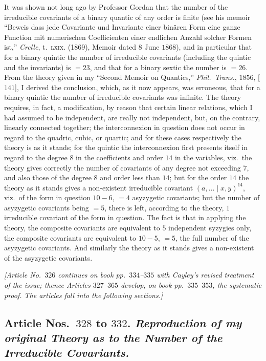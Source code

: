 \documentclass[11pt,a4paper]{article}
\providecommand{\midbar}{\mid}
\begin{document}
It was shown not long ago by Professor Gordan that the number of the
irreducible covariants of a binary quantic of any order is finite (see his
memoir ``Beweis dass jede Covariante und Invariante einer bin\"aren Form
eine ganze Function mit numerischen Coefficienten einer endlichen Anzahl
solcher Formen ist,'' \textit{Crelle}, t.~\textsc{lxix.} (1869), Memoir
dated $8$ June $1868$), and in particular that for a binary quintic the
number of irreducible covariants (including the quintic and the
invariants) is $= 23$, and that for a binary sextic the number is $= 26$.
From the theory given in my ``Second Memoir on Quantics,'' \textit{Phil.\
Trans.}, $1856$, [$141$], I derived the conclusion, which, as it now
appears, was erroneous, that for a binary quintic the number of
irreducible covariants was infinite. The theory requires, in fact, a
modification, by reason that certain linear relations, which I had
assumed to be independent, are really not independent, but, on the
contrary, linearly connected together; the interconnexion in question
does not occur in regard to the quadric, cubic, or quartic; and for these
cases respectively the theory is as it stands; for the quintic the
interconnexion first presents itself in regard to the degree $8$ in the
coefficients and order $14$ in the variables, viz.\ the theory gives
correctly the number of covariants of any degree not exceeding $7$, and
also those of the degree $8$ and order less than $14$; but for the order
$14$ the theory as it stands gives a non-existent irreducible covariant
$(a, \dotsc \!\midbar\! x, y)^{14}$, viz.\ of the form in question
$10 - 6$, $= 4$ asyzygetic covariants; but the number of asyzygetic
covariants being $= 5$, there is left, according to the theory, $1$
irreducible covariant of the form in question. The fact is that in
applying the theory, the composite covariants are equivalent to $5$
independent syzygies only, the composite covariants are equivalent to
$10 - 5$, $= 5$, the full number of the asyzygetic covariants. And similarly
the theory as it stands gives a non-existent of the asyzygetic covariants.

\medskip

\noindent\textit{[Article No.~$326$ continues on book pp.~$334$--$335$ with
Cayley's revised treatment of the issue; thence Articles $327$--$365$
develop, on book pp.~$335$--$353$, the systematic proof. The articles fall
into the following sections.]}

\medskip

\subsection*{Article Nos.\ $328$ to $332$. \textit{Reproduction of my
original Theory as to the Number of the Irreducible Covariants.}}
\end{document}
